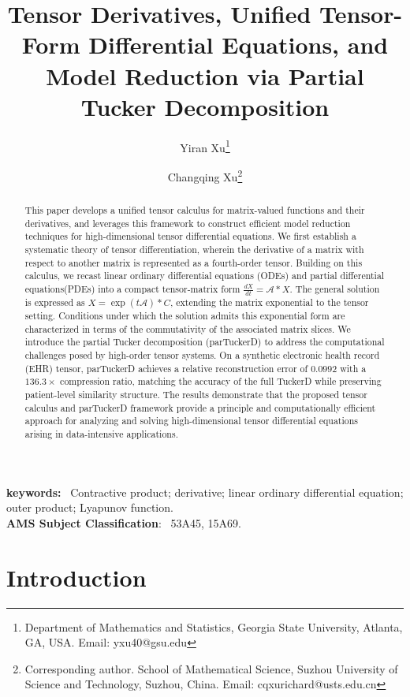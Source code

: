 \documentclass[11pt, oneside]{article}  %
\title{Tensor Derivatives, Unified Tensor-Form Differential Equations, and Model Reduction via Partial Tucker Decomposition}
\author{
Yiran Xu\thanks{Department of Mathematics and Statistics, Georgia State University, Atlanta, GA, USA. 
Email: yxu40@gsu.edu}
\and
Changqing Xu\thanks{Corresponding author. School of Mathematical Science, Suzhou University of Science and 
Technology, Suzhou, China. Email: cqxurichard@usts.edu.cn}}
\date{}
\newcommand{\A}{\mathcal{A}}
\begin{document}
\maketitle

\begin{abstract}
This paper develops a unified tensor calculus for matrix-valued functions and their derivatives, and leverages this framework to construct efficient 
model reduction techniques for high-dimensional tensor differential equations.  We first establish a systematic theory of tensor differentiation, 
wherein the derivative of a matrix with respect to another matrix is represented as a fourth-order tensor. Building on this calculus, we recast linear 
ordinary differential equations (ODEs) and partial differential equations(PDEs) into a compact tensor-matrix form $\frac{dX}{dt} = \A\ast X$. The 
general solution is expressed as $X = \exp(t\A)\ast C$, extending the matrix exponential to the tensor setting. Conditions under which the solution 
admits this exponential form are characterized in terms of the commutativity of the associated matrix slices. We introduce the partial Tucker 
decomposition (parTuckerD) to address the computational challenges posed by high-order tensor systems. On a synthetic electronic health record 
(EHR) tensor, parTuckerD achieves a relative reconstruction error of $0.0992$ with a $136.3\times$ compression ratio, matching the accuracy of the 
full TuckerD while preserving patient-level similarity structure. The results demonstrate that the proposed tensor calculus and parTuckerD framework 
provide a principle and computationally efficient approach for analyzing and solving high-dimensional tensor differential equations arising in data-intensive applications.
\end{abstract}

\noindent \textbf{keywords:} \  Contractive product; derivative; linear ordinary differential equation; outer product; Lyapunov function.\\
\noindent \textbf {AMS Subject Classification}: \   53A45, 15A69.  \\


\section{Introduction}
\setcounter{equation}{0}
\end{document}
